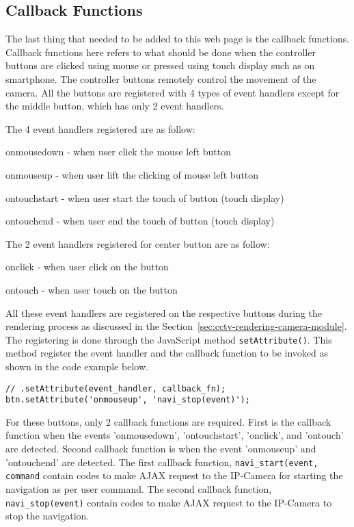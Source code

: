 \subsection*{Callback Functions}
The last thing that needed to be added to this web page is the callback functions. Callback functions here refers to what should be done when the controller buttons are clicked using mouse or pressed using touch display such as on smartphone. The controller buttons remotely control the movement of the camera. All the buttons are registered with 4 types of event handlers except for the middle button, which has only 2 event handlers.

The 4 event handlers registered are as follow:
\begin{itemize*}
\item onmousedown - when user click the mouse left button
\item onmouseup - when user lift the clicking of mouse left button
\item ontouchstart - when user start the touch of button (touch display)
\item ontouchend - when user end the touch of button (touch display)
\end{itemize*}

The 2 event handlers registered for center button are as follow:
\begin{itemize*}
\item onclick - when user click on the button
\item ontouch - when user touch on the button
\end{itemize*}

All these event handlers are registered on the respective buttons during the rendering process as discussed in the Section~\ref{sec:cctv-rendering-camera-module}. The registering is done through the JavaScript method \texttt{setAttribute()}. This method register the event handler and the callback function to be invoked as shown in the code example below.

\begin{lstlisting}
// .setAttribute(event_handler, callback_fn);
btn.setAttribute('onmouseup', 'navi_stop(event)');
\end{lstlisting}

For these buttons, only 2 callback functions are required. First is the callback function when the events 'onmousedown', 'ontouchstart', 'onclick', and 'ontouch' are detected. Second callback function is when the event 'onmouseup' and 'ontouchend' are detected. The first callback function, \texttt{navi\_start(event, command} contain codes to make AJAX request to the IP-Camera for starting the navigation as per user command. The second callback function, \texttt{navi\_stop(event)} contain codes to make AJAX request to the IP-Camera to stop the navigation.

